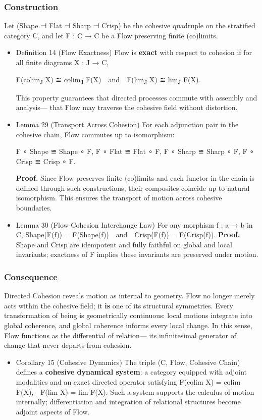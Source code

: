 \documentclass[11pt]{article}
\begin{document}
\subsubsection*{Construction}
\label{sec:org16ef907}
Let (Shape ⊣ Flat ⊣ Sharp ⊣ Crisp) be the cohesive quadruple on the stratified category C,  
and let F : C → C be a Flow preserving finite (co)limits.
\begin{itemize}
\item Definition 14 (Flow Exactness)
\label{sec:org0944165}
Flow is \textbf{exact} with respect to cohesion if for all finite diagrams X : J → C,

F(colim\textsubscript{J} X) ≅ colim\textsubscript{J} F(X) and F(lim\textsubscript{J} X) ≅ lim\textsubscript{J} F(X).

This property guarantees that directed processes commute with assembly and analysis—  
that Flow may traverse the cohesive field without distortion.
\item Lemma 29 (Transport Across Cohesion)
\label{sec:orgc2c4488}
For each adjunction pair in the cohesive chain,
Flow commutes up to isomorphism:

F ∘ Shape ≅ Shape ∘ F,  
F ∘ Flat ≅ Flat ∘ F,  
F ∘ Sharp ≅ Sharp ∘ F,  
F ∘ Crisp ≅ Crisp ∘ F.

\textbf{Proof.}  
Since Flow preserves finite (co)limits and each functor in the chain is defined through such constructions,  
their composites coincide up to natural isomorphism.  
This ensures the transport of motion across cohesive boundaries.
\item Lemma 30 (Flow-Cohesion Interchange Law)
\label{sec:orgb436a26}
For any morphism f : a → b in C,
Shape(F(f)) = F(Shape(f)) and Crisp(F(f)) = F(Crisp(f)).  
\textbf{Proof.}  
Shape and Crisp are idempotent and fully faithful on global and local invariants;  
exactness of F implies these invariants are preserved under motion.
\end{itemize}
\subsubsection*{Consequence}
\label{sec:orgf54dea7}
Directed Cohesion reveals motion as internal to geometry.  
Flow no longer merely acts within the cohesive field; it \textbf{is} one of its structural symmetries.  
Every transformation of being is geometrically continuous:  
local motions integrate into global coherence, and global coherence informs every local change.  
In this sense, Flow functions as the differential of relation—  
its infinitesimal generator of change that never departs from cohesion.
\begin{itemize}
\item Corollary 15 (Cohesive Dynamics)
\label{sec:org5337994}
The triple (C, Flow, Cohesive Chain) defines a \textbf{cohesive dynamical system}:  
a category equipped with adjoint modalities and an exact directed operator satisfying  
F(colim X) = colim F(X), F(lim X) = lim F(X).  
Such a system supports the calculus of motion internally;  
differentiation and integration of relational structures become adjoint aspects of Flow.
\end{itemize}
\end{document}
